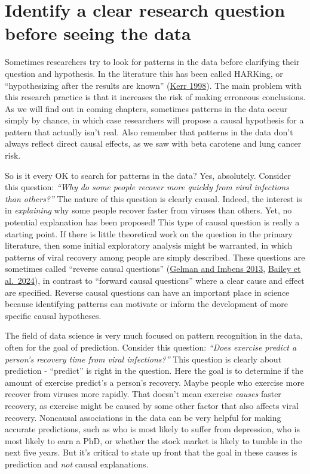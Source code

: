 \documentclass[
]{book}
\begin{document}
\section{Identify a clear research question before seeing the data}\label{identify-a-clear-research-question-before-seeing-the-data}

Sometimes researchers try to look for patterns in the data before clarifying their question and hypothesis. In the literature this has been called HARKing, or ``hypothesizing after the results are known'' (\href{https://journals.sagepub.com/doi/abs/10.1207/s15327957pspr0203_4}{Kerr 1998}). The main problem with this research practice is that it increases the risk of making erroneous conclusions. As we will find out in coming chapters, sometimes patterns in the data occur simply by chance, in which case researchers will propose a causal hypothesis for a pattern that actually isn't real. Also remember that patterns in the data don't always reflect direct causal effects, as we saw with beta carotene and lung cancer risk.

So is it every OK to search for patterns in the data? Yes, absolutely. Consider this question: \emph{``Why do some people recover more quickly from viral infections than others?''} The nature of this question is clearly causal. Indeed, the interest is in \emph{explaining} why some people recover faster from viruses than others. Yet, no potential explanation has been proposed! This type of causal question is really a starting point. If there is little theoretical work on the question in the primary literature, then some initial exploratory analysis might be warranted, in which patterns of viral recovery among people are simply described. These questions are sometimes called ``reverse causal questions'' (\href{https://www.nber.org/papers/w19614}{Gelman and Imbens 2013}, \href{https://www.nature.com/articles/s41562-024-01939-z}{Bailey et al.~2024}), in contrast to ``forward causal questions'' where a clear cause and effect are specified. Reverse causal questions can have an important place in science because identifying patterns can motivate or inform the development of more specific causal hypotheses.

The field of data science is very much focused on pattern recognition in the data, often for the goal of prediction. Consider this question: \emph{``Does exercise predict a person's recovery time from viral infections?''} This question is clearly about prediction - ``predict'' is right in the question. Here the goal is to determine if the amount of exercise predict's a person's recovery. Maybe people who exercise more recover from viruses more rapidly. That doesn't mean exercise \emph{causes} faster recovery, as exercise might be caused by some other factor that also affects viral recovery. Noncausal associations in the data can be very helpful for making accurate predictions, such as who is most likely to suffer from depression, who is most likely to earn a PhD, or whether the stock market is likely to tumble in the next five years. But it's critical to state up front that the goal in these causes is prediction and \emph{not} causal explanations.
\end{document}
